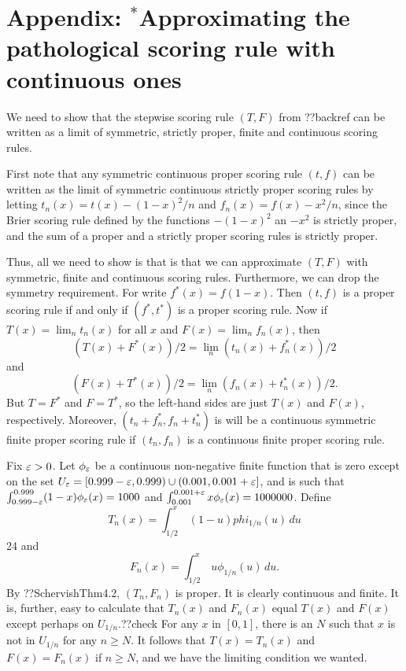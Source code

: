 \section*{Appendix: $^*$Approximating the pathological scoring rule with continuous ones}
We need to show that the stepwise scoring rule $(T,F)$ from ??backref can be written as a limit of
symmetric, strictly proper, finite and continuous scoring rules. 

First note that any symmetric continuous proper scoring rule $(t,f)$ can be written as the limit of symmetric continuous
strictly proper scoring rules by letting $t_n(x)=t(x)-(1-x)^2/n$ and $f_n(x)=f(x)-x^2/n$, since the Brier scoring rule defined
by the functions $-(1-x)^2$ an $-x^2$ is strictly proper, and the sum of a proper and a strictly proper scoring rules is
strictly proper. 

Thus, all we need to show is that is that we can approximate $(T,F)$ with symmetric, finite and continuous scoring rules.
Furthermore, we can drop the symmetry requirement. For write $f^*(x)=f(1-x)$. Then $(t,f)$ is a proper scoring rule if and
only if $(f^*,t^*)$ is a proper scoring rule. Now if $T(x)=\lim_n t_n(x)$ for all $x$ and $F(x)=\lim_n f_n(x)$, then
$$
    (T(x)+F^*(x))/2 = \lim_n (t_n(x)+f_n^*(x))/2
$$    
    and
$$    
    (F(x)+T^*(x))/2 = \lim_n (f_n(x)+t_n^*(x))/2. 
$$    
But $T=F^*$ and $F=T^*$, so the left-hand sides are just $T(x)$ and $F(x)$, respectively. Moreover, $(t_n+f_n^*,f_n+t_n^*)$ is 
will be a continuous symmetric finite proper scoring rule if $(t_n,f_n)$ is a continuous finite proper scoring rule.

Fix $\varepsilon>0$. Let $\phi_\varepsilon$ be a continuous non-negative finite function that is zero except on the set $U_\varepsilon=[0.999-\varepsilon,0.999)\cup (0.001,0.001+\varepsilon]$, 
and is such that $\int_{0.999-\varepsilon}^{0.999} (1-x) \phi_\varepsilon(x) = 1000$ and $\int_{0.001}^{0.001+\varepsilon} x \phi_\varepsilon(x) = 1000000$. 
Define 
$$
    T_n(x) = \int_{1/2}^x \, (1-u)phi_{1/n}(u) \, du
$$24
and 
$$
    F_n(x) = \int_{1/2}^x \, u \phi_{1/n}(u) \, du.
$$
By ??SchervishThm4.2, $(T_n,F_n)$ is proper. It is clearly continuous and finite. It is, further, easy to calculate that 
$T_n(x)$ and $F_n(x)$ equal $T(x)$ and $F(x)$ except perhaps on $U_{1/n}$.??check For any $x$ in $[0,1]$, there is an $N$
such that $x$ is not in $U_{1/n}$ for any $n\ge N$. It follows that $T(x)=T_n(x)$ and $F(x)=F_n(x)$ if $n\ge N$, and we have
the limiting condition we wanted.

\chaptertail 


